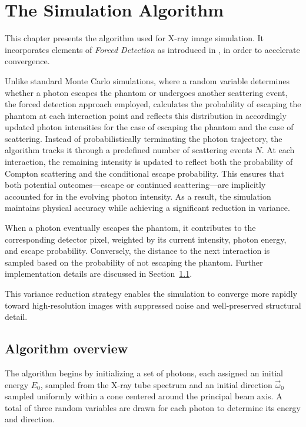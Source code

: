 \chapter{The Simulation Algorithm}
\label{chapter10}

This chapter presents the algorithm used for X-ray image simulation. It
incorporates elements of \emph{Forced Detection} as introduced in \cite{fd2001},
in order to accelerate convergence.

Unlike standard Monte Carlo simulations, where a random variable determines
whether a photon escapes the phantom or undergoes another scattering event, the
forced detection approach employed, calculates the probability of escaping the
phantom at each interaction point and reflects this distribution in accordingly
updated photon intensities for the case of escaping the phantom and the case of
scattering. Instead of probabilistically terminating the photon trajectory, the
algorithm tracks it through a predefined number of scattering events $N$. At
each interaction, the remaining intensity is updated to reflect both the
probability of Compton scattering and the conditional escape probability. This
ensures that both potential outcomes—escape or continued scattering—are
implicitly accounted for in the evolving photon intensity. As a result, the
simulation maintains physical accuracy while achieving a significant reduction
in variance.

When a photon eventually escapes the phantom, it contributes to the
corresponding detector pixel, weighted by its current intensity, photon energy,
and escape probability. Conversely, the distance to the next interaction is
sampled based on the probability of not escaping the phantom. Further
implementation details are discussed in Section~\ref{sec:algorithmOverview}.

This variance reduction strategy enables the simulation to converge more rapidly
toward high-resolution images with suppressed noise and well-preserved
structural detail.


\section{Algorithm overview}
\label{sec:algorithmOverview}

The algorithm begins by initializing a set of photons, each assigned an initial
energy $E_0$, sampled from the X-ray tube spectrum and an initial direction
$\vec{\omega}_0$ sampled uniformly within a cone centered around the principal
beam axis. A total of three random variables are drawn for each photon to
determine its energy and direction.

